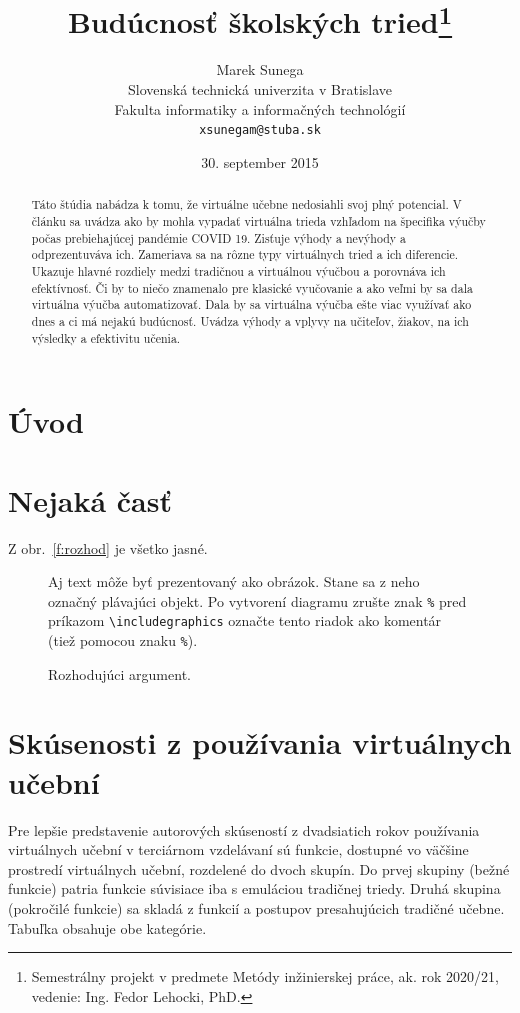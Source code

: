 \documentclass[10pt,twoside,slovak,a4paper]{article}
\title{Budúcnosť školských tried\thanks{Semestrálny projekt v predmete Metódy inžinierskej práce, ak. rok 2020/21, vedenie: Ing. Fedor Lehocki, PhD.}} %
\author{Marek Sunega\\[2pt]
	{\small Slovenská technická univerzita v Bratislave}\\
	{\small Fakulta informatiky a informačných technológií}\\
	{\small \texttt{xsunegam@stuba.sk}}
	}
\date{\small 30. september 2015} %
\begin{document}
\maketitle

\begin{abstract}
	Táto štúdia nabádza k tomu, že virtuálne učebne nedosiahli svoj plný potencial. V článku sa 
	uvádza ako by mohla vypadať virtuálna trieda vzhľadom na špecifika výučby počas 
	prebiehajúcej pandémie COVID 19. Zisťuje výhody a nevýhody a odprezentuváva ich. Zameriava 
	sa na rôzne typy virtuálnych tried a ich diferencie. Ukazuje hlavné rozdiely medzi tradičnou 
	a virtuálnou výučbou a porovnáva ich efektívnosť. Či by to niečo znamenalo pre klasické vyučovanie 
	a ako veľmi by sa dala virtuálna výučba automatizovať. Dala by sa virtuálna výučba ešte viac 
	využívať ako dnes a ci má nejakú budúcnosť. Uvádza výhody a vplyvy na učiteľov, žiakov, na ich 
	výsledky a efektivitu učenia.
\end{abstract}



\section{Úvod}




\section{Nejaká časť} \label{nejaka}

Z obr.~\ref{f:rozhod} je všetko jasné. 

\begin{figure}[tbh]
\centering
Aj text môže byť prezentovaný ako obrázok. Stane sa z neho označný plávajúci objekt. Po vytvorení diagramu zrušte znak \texttt{\%} pred príkazom \verb|\includegraphics| označte tento riadok ako komentár (tiež pomocou znaku \texttt{\%}).
\caption{Rozhodujúci argument.}
\end{figure}



\section{Skúsenosti z používania virtuálnych učební} \label{3}

Pre lepšie predstavenie autorových skúseností z dvadsiatich rokov používania virtuálnych učební 
v terciárnom vzdelávaní sú funkcie, dostupné vo väčšine prostredí virtuálnych učební, rozdelené do 
dvoch skupín. Do prvej skupiny (bežné funkcie) patria funkcie súvisiace iba s emuláciou tradičnej triedy. 
Druhá skupina (pokročilé funkcie) sa skladá z funkcií a postupov presahujúcich tradičné učebne. 
Tabuľka obsahuje obe kategórie.\cite{VCf}
\end{document}
